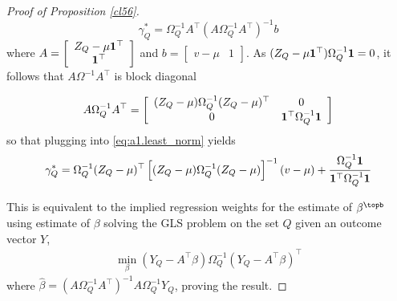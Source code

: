 \begin{proof}[Proof of Proposition \ref{cl56}]
\begin{equation}\label{eq:a1.least_norm}
 \gamma_Q^* = \Omega^{-1}_Q A^\top (A\Omega^{-1}_QA^\top)^{-1} b
\end{equation}
where $A = \left[ \begin{array}{cr} Z_Q - \mu {\bf 1}^\top\\ {\bf 1}^\top \end{array}\right]$ and $b = \left[\begin{array}{cr} v - \mu & 1 \end{array}\right]$. As $(Z_{Q} - \mu{\bf 1}^\top)\Omega_Q^{-1} {\bf 1} = 0$, it follows that $A\Omega^{-1}A^\top$ is block diagonal

\[ A\Omega_Q^{-1}A^\top = \left[\begin{array}{cc} (Z_Q - \mu)\Omega_Q^{-1} (Z_Q- \mu)^\top & 0  \\ 0 & {\bf 1}^\top \Omega^{-1}_Q{\bf 1}\end{array}\right] \]
so that plugging into \eqref{eq:a1.least_norm} yields
 \begin{equation*}
 \gamma^*_{Q} = \Omega_{Q}^{-1} (Z_{Q} - \mu)^\top\left[ (Z_Q - \mu) \Omega_{Q}^{-1} (Z_Q - \mu)\right]^{-1} (v - \mu) + \frac{\Omega^{-1}_Q {\bf 1} }{{\bf 1}^\top \Omega^{-1}_Q {\bf 1}}
 \end{equation*}

This is equivalent to the implied regression weights for the estimate of $\beta^\topb$ using estimate of $\beta$ solving the GLS problem on the set $Q$ given an outcome vector $Y$, 
\begin{align*}
    \min_{\beta} (Y_Q - A^\top\beta)\Omega_Q^{-1}(Y_Q - A^\top\beta)^\top
\end{align*}
%
where $\hat{\beta} = (A\Omega_Q^{-1}A^\top)^{-1}A\Omega_Q^{-1}Y_Q$, proving the result.

\end{proof}


